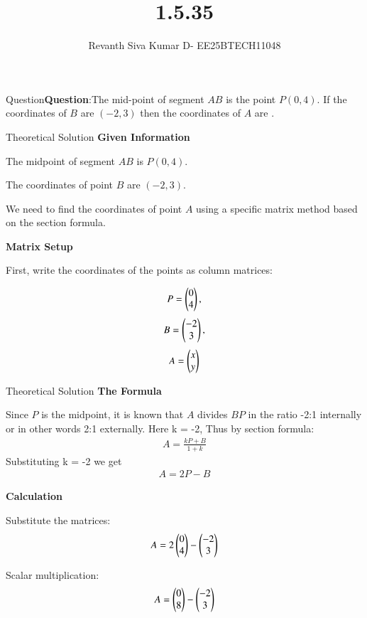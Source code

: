 \documentclass{beamer}
\title %
{1.5.35}
\date{}
\author %
{Revanth Siva Kumar D- EE25BTECH11048}
\begin{document}
	
		\frame{\titlepage}
	\begin{frame}{Question}\textbf{Question}:The mid-point of segment $AB$ is the point $P(0,4)$. If the coordinates of $B$ are $(-2,3)$ then the coordinates of $A$ are \underline{\hspace{1.5cm}}.
    \end{frame}

\begin{frame}{Theoretical Solution}
    \textbf{Given Information}  

The midpoint of segment $AB$ is $P(0,4)$.  

The coordinates of point $B$ are $(-2,3)$.  

We need to find the coordinates of point $A$ using a specific matrix method based on the section formula.  


\textbf{Matrix Setup}  

First, write the coordinates of the points as column matrices:  

\begin{align*}
    P = \begin{pmatrix}0 \\ 4\end{pmatrix}, 
\end{align*}
\begin{align*}
    B = \begin{pmatrix}-2 \\ 3\end{pmatrix}, 
\end{align*}
\begin{align*}
    A = \begin{pmatrix}x \\ y\end{pmatrix}
\end{align*}
\end{frame}
\begin{frame}{Theoretical Solution}
    \textbf{The Formula}  

Since $P$ is the midpoint, it is known that $A$ divides $BP$ in the ratio -2:1 internally or in other words 2:1 externally.
Here k = -2, Thus by section formula:
\begin{align*}
A = \frac{kP+B}{1+k}
\end{align*}
Substituting k = -2 we get
\begin{align*}
    A = 2P - B
\end{align*}


\textbf{Calculation}  

Substitute the matrices:  
\begin{align*}
    A = 2 \begin{pmatrix}0 \\ 4\end{pmatrix} - \begin{pmatrix}-2 \\ 3\end{pmatrix}
\end{align*}



Scalar multiplication:  
\begin{align*}
    A = \begin{pmatrix}0 \\ 8\end{pmatrix} - \begin{pmatrix}-2 \\ 3\end{pmatrix}
\end{align*}
\end{frame}
\end{document}
